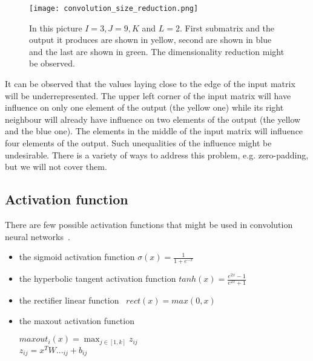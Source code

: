 \documentclass[a4paper,10pt]{report}
\begin{document}
	  
	  \begin{figure}[h!]
	    \centering
	    \texttt{[image: convolution\_size\_reduction.png]}
	    \caption{In this picture $I = 3, J = 9, K$ and $L = 2$. First submatrix and the output it produces are shown in yellow, second are shown in blue and the last are shown in green. The dimensionality reduction might be observed.}
	    \label{fig:convolution_size_reduction}
	  \end{figure} 
	  
	  It can be observed that the values laying close to the edge of the input matrix will be underrepresented. The upper left corner of the input matrix will have influence on only one element of the output (the yellow one) while its right neighbour will already have influence on two elements of the output (the yellow and the blue one). The elements in the middle of the input matrix will influence four elements of the output. Such unequalities of the influence might be undesirable. There is a variety of ways to address this problem, e.g. zero-padding, but we will not cover them.\\
	  
	  
	\subsection{Activation function}\label{sec:ACTIVATION_FUNCTIONS}
	  There are few possible activation functions that might be used in convolution neural networks~\cite{DUTCH}.
	  \begin{itemize}
	   \item the sigmoid activation function $\sigma(x) = \frac{1}{1 + e^{-x}}$
	   \item the hyperbolic tangent activation function $tanh(x) = \frac{e^{2x} - 1}{e^{2x} + 1}$
	   \item the rectifier linear function~\cite{GLOROT_BENGIO} $rect(x) = max(0,x)$
	   \item the maxout activation function
	    \begin{center}
	      $maxout_i(x) = \max_{j \in [1, k]}z_{ij}$\\
	      $z_{ij}=x^TW..._{ij} + b_{ij} $ %
	    \end{center}
	  \end{itemize}
\end{document}
